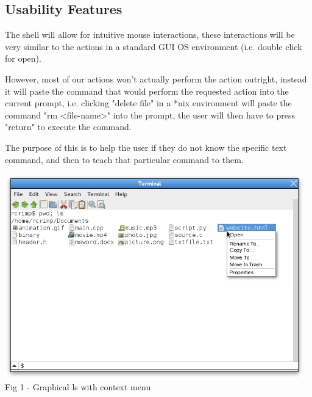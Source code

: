 \documentclass[a4paper,12pt]{article}
\begin{document}

\subsection*{Usability Features}
The shell will allow for intuitive mouse interactions, these interactions will be very similar to the actions in a standard GUI OS environment (i.e. double click for open).

However, most of our actions won't actually perform the action outright, instead it will paste the command that would perform the requested action into the current prompt, i.e. clicking "delete file" in a *nix environment will paste the command "rm \textless file-name\textgreater" into the prompt, the user will then have to press "return" to execute the command.

The purpose of this is to help the user if they do not know the specific text command, and then to teach that particular command to them.

\begin{center}
  \includegraphics[width=13cm]{context.png}\\
  \small Fig 1 - Graphical ls with context menu
\end{center}
\end{document}

